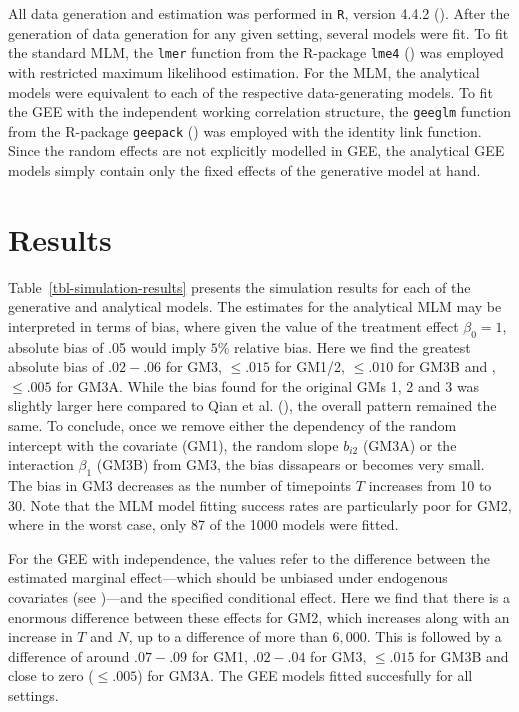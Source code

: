 \documentclass[
  12pt,
  a4paper,
]{article}
\begin{document}
All data generation and estimation was performed in \texttt{R}, version
4.4.2 (). After the generation
of data generation for any given setting, several models were fit. To
fit the standard MLM, the \texttt{lmer} function from the R-package
\texttt{lme4} () was
employed with restricted maximum likelihood estimation. For the MLM, the
analytical models were equivalent to each of the respective
data-generating models. To fit the GEE with the independent working
correlation structure, the \texttt{geeglm} function from the R-package
\texttt{geepack} () was
employed with the identity link function. Since the random effects are
not explicitly modelled in GEE, the analytical GEE models simply contain
only the fixed effects of the generative model at hand.

\section{Results}\label{results}

Table~\ref{tbl-simulation-results} presents the simulation results for
each of the generative and analytical models. The estimates for the
analytical MLM may be interpreted in terms of bias, where given the
value of the treatment effect \(\beta_0 = 1\), absolute bias of .05
would imply \(5\%\) relative bias. Here we find the greatest absolute
bias of \(.02-.06\) for GM3, \(\leq .015\) for GM1/2, \(\leq .010\) for
GM3B and , \(\leq .005\) for GM3A. While the bias found for the original
GMs 1, 2 and 3 was slightly larger here compared to Qian et al.
(), the overall pattern remained the same.
To conclude, once we remove either the dependency of the random
intercept with the covariate (GM1), the random slope \(b_{i2}\) (GM3A)
or the interaction \(\beta_1\) (GM3B) from GM3, the bias dissapears or
becomes very small. The bias in GM3 decreases as the number of
timepoints \(T\) increases from 10 to 30. Note that the MLM model
fitting success rates are particularly poor for GM2, where in the worst
case, only 87 of the 1000 models were fitted.

For the GEE with independence, the values refer to the difference
between the estimated marginal effect---which should be unbiased under
endogenous covariates (see )---and the specified conditional effect. Here we find that there
is a enormous difference between these effects for GM2, which increases
along with an increase in \(T\) and \(N\), up to a difference of more
than \(6,000\). This is followed by a difference of around \(.07-.09\)
for GM1, \(.02-.04\) for GM3, \(\leq .015\) for GM3B and close to zero
(\(\leq .005\)) for GM3A. The GEE models fitted succesfully for all
settings.
\end{document}
